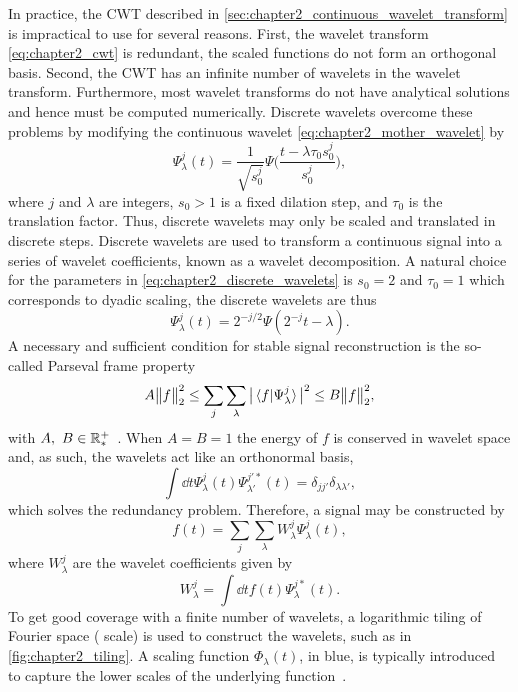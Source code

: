 In practice, the CWT described in \cref{sec:chapter2_continuous_wavelet_transform} is impractical to use for several reasons.
First, the wavelet transform \cref{eq:chapter2_cwt} is redundant, \ie{} the scaled functions do not form an orthogonal basis.
Second, the CWT has an infinite number of wavelets in the wavelet transform.
Furthermore, most wavelet transforms do not have analytical solutions and hence must be computed numerically.
Discrete wavelets overcome these problems by modifying the continuous wavelet \cref{eq:chapter2_mother_wavelet} by
%
\begin{equation}\label{eq:chapter2_discrete_wavelets}
	\Psi^{j}_{\lambda}(t)
	= \frac{1}{\sqrt{s^{j}_{0}}} \Psi\Bigg(\frac{t - \lambda\tau_{0}s^{j}_{0}}{s^{j}_{0}}\Bigg),
\end{equation}
%
where \(j\) and \(\lambda{}\) are integers, \(s_{0}>1\) is a fixed dilation step, and \(\tau_{0}\) is the translation factor.
Thus, discrete wavelets may only be scaled and translated in discrete steps.
Discrete wavelets are used to transform a continuous signal into a series of wavelet coefficients, known as a wavelet decomposition.
A natural choice for the parameters in \cref{eq:chapter2_discrete_wavelets} is \(s_{0}=2\) and \(\tau_{0}=1\) which corresponds to dyadic scaling, the discrete wavelets are thus
%
\begin{equation}
	\Psi^{j}_{\lambda}(t)
	= 2^{-j/2} \Psi(2^{-j}t - \lambda).
\end{equation}
%
A necessary and sufficient condition for stable signal reconstruction is the so-called Parseval frame property
%
\begin{equation}
	A {\big\lVert f\big\rVert}_{2}^{2}
	\leq \sum\limits_{j} \sum\limits_{\lambda} \big\lvert\braket*{f}{\Psi^{j}_{\lambda}}\big\rvert^{2}
	\leq B {\big\lVert f\big\rVert}_{2}^{2},
\end{equation}
%
with \(A,\ B \in \mathbb{R}_{\ast}^{+}{}\)~\cite{Daubechies1992}.
When \(A=B=1\) the energy of \(f\) is conserved in wavelet space and, as such, the wavelets act like an orthonormal basis, \ie{}
%
\begin{equation}
	\int\dd{t} \Psi^{j}_{\lambda}(t) \Psi^{j'\ast}_{\lambda'}(t)
	= \delta_{j j'} \delta_{\lambda\lambda'},
\end{equation}
%
which solves the redundancy problem.
Therefore, a signal may be constructed by~\cite{Sheng2010}
%
\begin{equation}
	f(t)
	= \sum\limits_{j} \sum\limits_{\lambda} W^{j}_{\lambda} \Psi^{j}_{\lambda}(t),
\end{equation}
%
where \(W^{j}_{\lambda}\) are the wavelet coefficients given by
%
\begin{equation}
	W^{j}_{\lambda}
	= \int\dd{t} f(t) \Psi^{j\ast}_{\lambda}(t).
\end{equation}
%
To get good coverage with a finite number of wavelets, a logarithmic tiling of Fourier space (\ie{} scale) is used to construct the wavelets, such as in \cref{fig:chapter2_tiling}.
A scaling function \(\Phi_{\lambda}(t)\), in blue, is typically introduced to capture the lower scales of the underlying function~\cite{Mallat1989}.

